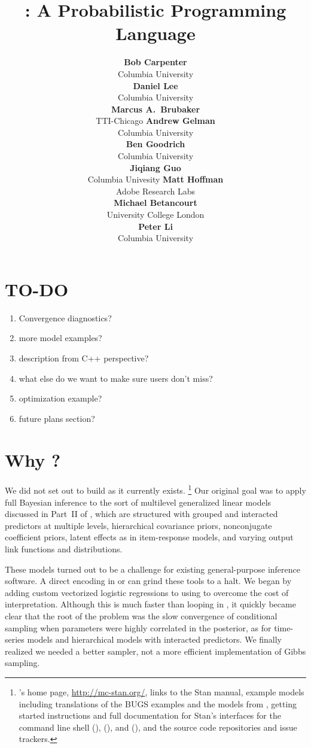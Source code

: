 \documentclass[article]{jss}
\author{{\bf\large Bob Carpenter}
        \\ Columbia University
        \\[9pt]
        {\bf\large Daniel Lee}
        \\ Columbia University
        \\[9pt]
        {\bf\large Marcus A.\ Brubaker}
        \\ TTI-Chicago
    \And
        {\bf\large Andrew Gelman}
        \\ Columbia University
        \\[9pt]
        {\bf\large Ben Goodrich}
        \\ Columbia University
        \\[9pt]
        {\bf\large Jiqiang Guo}
        \\ Columbia Univesity
     \And
        {\bf\large Matt Hoffman}
        \\ Adobe Research Labs
        \\[9pt]
        {\bf\large Michael Betancourt}
        \\ University College London
        \\[9pt]
        {\bf\large Peter Li}
        \\ Columbia University
}
\title{\proglang{Stan}: A Probabilistic Programming Language}
\begin{document}
\section{TO-DO}

\begin{enumerate}
\item Convergence diagnostics?
\item more model examples?
\item description from C++ perspective?
\item what else do we want to make sure users don't miss?
\item optimization example?
\item future plans section?
\end{enumerate}


\section[Why Stan?]{Why ?}

We did not set out to build  as it currently exists.%
%
\footnote{'s home page, \url{http://mc-stan.org/},
  links to the Stan manual, example models including translations of
  the BUGS examples and the models from \citep{GelmanHill:2007},
  getting started instructions and full documentation for Stan's
  interfaces for the command line shell (), 
  (), and  (), and the source code repositories
  and issue trackers.}
%
Our original goal was to apply full Bayesian inference to the sort of multilevel
generalized linear models discussed in Part~II of
\citep{GelmanHill:2007}, which are structured with grouped and
interacted predictors at multiple levels, hierarchical covariance
priors, nonconjugate coefficient priors, latent effects as in
item-response models, and varying output link functions and
distributions.

These models turned out to be a challenge for
existing general-purpose inference software.  A direct encoding in
 \citep{LunnEtAl:2000,LunnEtAl:2009,LunnEtAl:2012} or
 \citep{Plummer:2003} can grind these tools to a halt.
We began by adding custom vectorized logistic regressions to 
using  to overcome the cost of interpretation.  Although
this is much faster than looping in , it quickly became
clear that the root of the problem was the slow convergence of
conditional sampling when parameters were highly correlated 
in the posterior, as for time-series models and hierarchical models 
with interacted predictors.  We finally realized we needed a better sampler, 
not a more efficient implementation of Gibbs sampling.
\end{document}
